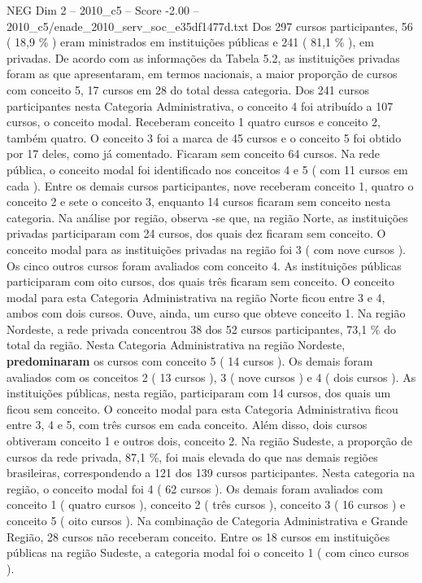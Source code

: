 \begin{textsample}{NEG Dim 2 – 2010\_c5 – Score -2.00 – 2010\_c5/enade\_2010\_serv\_soc\_e35df1477d.txt}
Dos 297 cursos participantes, 56 ( 18,9 \% ) eram ministrados em instituições públicas e 241 ( 81,1 \% ), em privadas.
De acordo com as informações da Tabela 5.2, as instituições privadas foram as que apresentaram, em termos nacionais, a maior proporção de cursos com conceito 5, 17 cursos em 28 do total dessa categoria.
Dos 241 cursos participantes nesta Categoria Administrativa, o conceito 4 foi atribuído a 107 cursos, o conceito modal.
Receberam conceito 1 quatro cursos e conceito 2, também quatro.
O conceito 3 foi a marca de 45 cursos e o conceito 5 foi obtido por 17 deles, como já comentado.
Ficaram sem conceito 64 cursos.
Na rede pública, o conceito modal foi identificado nos conceitos 4 e 5 ( com 11 cursos em cada ).
Entre os demais cursos participantes, nove receberam conceito 1, quatro o conceito 2 e sete o conceito 3, enquanto 14 cursos ficaram sem conceito nesta categoria.
Na análise por região, observa -se que, na região Norte, as instituições privadas participaram com 24 cursos, dos quais dez ficaram sem conceito.
O conceito modal para as instituições privadas na região foi 3 ( com nove cursos ).
Os cinco outros cursos foram avaliados com conceito 4.
As instituições públicas participaram com oito cursos, dos quais três ficaram sem conceito.
O conceito modal para esta Categoria Administrativa na região Norte ficou entre 3 e 4, ambos com dois cursos.
Ouve, ainda, um curso que obteve conceito 1.
Na região Nordeste, a rede privada concentrou 38 dos 52 cursos participantes, 73,1 \% do total da região.
Nesta Categoria Administrativa na região Nordeste, \textbf{predominaram} os cursos com conceito 5 ( 14 cursos ).
Os demais foram avaliados com os conceitos 2 ( 13 cursos ), 3 ( nove cursos ) e 4 ( dois cursos ).
As instituições públicas, nesta região, participaram com 14 cursos, dos quais um ficou sem conceito.
O conceito modal para esta Categoria Administrativa ficou entre 3, 4 e 5, com três cursos em cada conceito.
Além disso, dois cursos obtiveram conceito 1 e outros dois, conceito 2.
Na região Sudeste, a proporção de cursos da rede privada, 87,1 \%, foi mais elevada do que nas demais regiões brasileiras, correspondendo a 121 dos 139 cursos participantes.
Nesta categoria na região, o conceito modal foi 4 ( 62 cursos ).
Os demais foram avaliados com conceito 1 ( quatro cursos ), conceito 2 ( três cursos ), conceito 3 ( 16 cursos ) e conceito 5 ( oito cursos ).
Na combinação de Categoria Administrativa e Grande Região, 28 cursos não receberam conceito.
Entre os 18 cursos em instituições públicas na região Sudeste, a categoria modal foi o conceito 1 ( com cinco cursos ).

\end{textsample}
